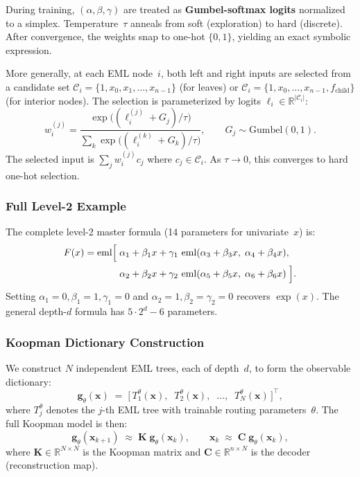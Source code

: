 \documentclass[11pt]{article}
\DeclareMathOperator{\eml}{eml}
\newcommand{\bx}{\mathbf{x}}
\newcommand{\bg}{\mathbf{g}}
\newcommand{\bK}{\mathbf{K}}
\newcommand{\bC}{\mathbf{C}}
\newcommand{\R}{\mathbb{R}}
\newcommand{\cC}{\mathcal{C}}
\begin{document}
During training, $(\alpha, \beta, \gamma)$ are treated as \textbf{Gumbel-softmax
logits} \citep{jang2017} normalized to a simplex.  Temperature~$\tau$ anneals from soft
(exploration) to hard (discrete).  After convergence, the weights snap to one-hot
$\{0, 1\}$, yielding an exact symbolic expression.

More generally, at each EML node~$i$, both left and right inputs are selected from
a candidate set
$\cC_i = \{1, x_0, x_1, \ldots, x_{n-1}\}$ (for leaves) or
$\cC_i = \{1, x_0, \ldots, x_{n-1}, f_{\text{child}}\}$ (for interior nodes).
The selection is parameterized by logits $\ell_i \in \R^{|\cC_i|}$:
\begin{equation}\label{eq:gumbel}
  w_i^{(j)} = \frac{\exp\!\bigl((\ell_i^{(j)} + G_j)/\tau\bigr)}
  {\sum_k \exp\!\bigl((\ell_i^{(k)} + G_k)/\tau\bigr)},
  \qquad G_j \sim \text{Gumbel}(0,1).
\end{equation}
The selected input is $\sum_j w_i^{(j)} c_j$ where $c_j \in \cC_i$.  As
$\tau \to 0$, this converges to hard one-hot selection.

\subsubsection{Full Level-2 Example}

The complete level-2 master formula (14 parameters for univariate~$x$) is:
\begin{equation}\label{eq:level2}
\begin{split}
  F(x) = \eml\Bigl[\;
    &\alpha_1 + \beta_1 x + \gamma_1\,\eml(\alpha_3 + \beta_3 x,\;\alpha_4 + \beta_4 x), \\
    &\alpha_2 + \beta_2 x + \gamma_2\,\eml(\alpha_5 + \beta_5 x,\;\alpha_6 + \beta_6 x)
  \;\Bigr].
\end{split}
\end{equation}
Setting $\alpha_1\!=\!0, \beta_1\!=\!1, \gamma_1\!=\!0$ and
$\alpha_2\!=\!1, \beta_2\!=\!\gamma_2\!=\!0$ recovers $\exp(x)$.  The general
depth-$d$ formula has $5 \cdot 2^d - 6$ parameters.

\subsubsection{Koopman Dictionary Construction}

We construct $N$ independent EML trees, each of depth~$d$, to form the observable
dictionary:
\begin{equation}\label{eq:dictionary}
  \bg_\theta(\bx) \;=\; \bigl[\,T_1^\theta(\bx),\;\; T_2^\theta(\bx),\;\;
  \ldots,\;\; T_N^\theta(\bx)\,\bigr]^\top,
\end{equation}
where $T_j^\theta$ denotes the $j$-th EML tree with trainable routing
parameters~$\theta$.  The full Koopman model is then:
\begin{equation}\label{eq:koopman-model}
  \bg_\theta(\bx_{k+1}) \;\approx\; \bK\;\bg_\theta(\bx_k), \qquad
  \bx_k \;\approx\; \bC\;\bg_\theta(\bx_k),
\end{equation}
where $\bK \in \R^{N \times N}$ is the Koopman matrix and
$\bC \in \R^{n \times N}$ is the decoder (reconstruction map).
\end{document}
